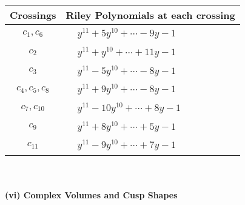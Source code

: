 \documentclass[1p]{elsarticle_modified}
\theoremstyle{definition}
\begin{document}
\begin{tabular}{m{50pt}|m{274pt}}
Crossings & \hspace{64pt}Riley Polynomials at each crossing \\
\hline $$\begin{aligned}c_{1},c_{6}\end{aligned}$$&$\begin{aligned}
&y^{11}+5 y^{10}+\cdots-9 y-1
\end{aligned}$\\
\hline $$\begin{aligned}c_{2}\end{aligned}$$&$\begin{aligned}
&y^{11}+y^{10}+\cdots+11 y-1
\end{aligned}$\\
\hline $$\begin{aligned}c_{3}\end{aligned}$$&$\begin{aligned}
&y^{11}-5 y^{10}+\cdots-8 y-1
\end{aligned}$\\
\hline $$\begin{aligned}c_{4},c_{5},c_{8}\end{aligned}$$&$\begin{aligned}
&y^{11}+9 y^{10}+\cdots-8 y-1
\end{aligned}$\\
\hline $$\begin{aligned}c_{7},c_{10}\end{aligned}$$&$\begin{aligned}
&y^{11}-10 y^{10}+\cdots+8 y-1
\end{aligned}$\\
\hline $$\begin{aligned}c_{9}\end{aligned}$$&$\begin{aligned}
&y^{11}+8 y^{10}+\cdots+5 y-1
\end{aligned}$\\
\hline $$\begin{aligned}c_{11}\end{aligned}$$&$\begin{aligned}
&y^{11}-9 y^{10}+\cdots+7 y-1
\end{aligned}$\\
\hline
\end{tabular}\\~\\
\newpage\flushleft \textbf{(vi) Complex Volumes and Cusp Shapes}
\end{document}
